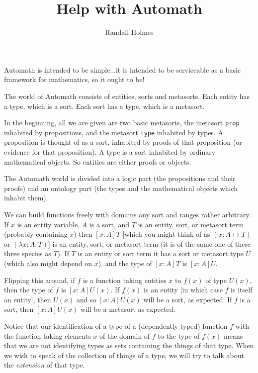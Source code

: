 \documentclass[12pt]{article}
\title{Help with Automath}
\author{Randall Holmes}
\begin{document}
\maketitle

Automath is intended to be simple...it is intended to be serviceable as a basic framework for mathematics, so it ought to be!

The world of Automath consists of entities, sorts and metasorts.  Each entity has a type, which is a sort.  Each sort has a type, which is a metasort.

In the beginning, all we are given are two basic metasorts, the metasort {\tt prop} inhabited by propositions, and the metasort {\tt type} inhabited by types.
A proposition is thought of as a sort, inhabited by proofs of that proposition (or evidence for that proposition).  A type is a sort inhabited by ordinary mathematical objects.
So entities are either proofs or objects.

The Automath world is divided into a logic part (the propositions and their proofs) and an ontology part (the types and the mathematical objects which inhabit them).

We can build functions freely with domains any sort and ranges rather arbitrary.  If $x$ is an entity variable, $A$ is a sort, and $T$ is an entity, sort, or metasort term (probably containing $x$)
then $[x:A]T$ [which you might think of as $(x:A \mapsto T)$ or $(\lambda x:A:T)$] is an entity, sort, or metasort term (it is of the same one of these three species as $T$).  If $T$ is an entity or sort term it has a sort or metasort type $U$ (which also might depend on $x$), and the type of $[x:A]T$ is $[x:A]U$.

Flipping this around, if $f$ is a function taking entities $x$ to  $f(x)$ of type $U(x)$, then the type of $f$ is $[x:A]U(x)$.  If $f(x)$ is an entity [in which case $f$ is itself an entity], then $U(x)$ and so $[x:A]U(x)$ will be a sort, as expected.  If $f$ is a sort, then $[x:A]U(x)$ will be a metasort as expected.

Notice that our identification of a type of a (dependently typed) function $f$ with the function taking elements $x$ of the domain of $f$ to the type of $f(x)$ means that we are not identifying types as sets containing the things of that type.  When we wish to speak of the collection of things of a type, we will try to talk about the {\em extension\/} of that type.
\end{document}
